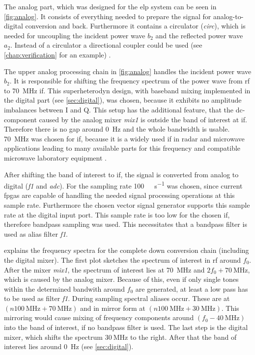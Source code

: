 \documentclass[12pt,a4paper,parskip=full,abstract=true,BCOR=10mm,twoside,open=right]{scrreprt}
\begin{document}
The analog part, which was designed for the \gls{elp} system can be seen in
\cref{fig:analog}. It consists of everything needed to prepare the signal
for analog-to-digital conversion and back. Furthermore it contains a
circulator (\textit{circ}), which is needed for uncoupling the
incident power wave $b_2$ and the reflected power wave $a_2$. Instead of a
circulator a directional coupler could be used (see
\cref{chap:verification} for an example) \cite{ghannouchi_load-pull_2013}.

The upper analog processing chain in \cref{fig:analog} handles the
incident power wave $b_2$. It is responsible for shifting the frequency spectrum
of the power wave from \gls{rf} to \SI{70}{\mega\hertz} \gls{if}. This
superheterodyn design, with baseband mixing implemented in the digital
part (see \cref{sec:digital}), was chosen, because it exhibits no amplitude
imbalances between I and Q. This setup has the additional feature, that
the \gls{dc}-component caused by the analog mixer \textit{mix1} is outside the
band of interest at \gls{if}. Therefore there is no gap around \SI{0}{\hertz}
and the whole bandwidth is usable. \SI{70}{\mega\hertz} was chosen for \gls{if},
because it is a widely used \gls{if} in radar and microwave applications
\cite{tozer_broadcast_2004,ahamed_design_1997,whitaker_rf_2002,penttinen_telecommunications_2015}
leading to many available parts for this frequency and compatible microwave
laboratory equipment \cite{agilent_h70}.

After shifting the band of interest to \gls{if}, the signal is converted from
analog to digital (\textit{f1} and \textit{adc}). For the sampling rate
\SI{100}{\mega\samples\per\second} was chosen, since current \glspl{fpga} are
capable of handling the needed signal processing operations at this sample
rate. Furthermore the chosen vector signal generator supports this sample rate
at the digital input port. This sample rate is too low for the chosen
\gls{if}, therefore bandpass sampling was used. This necessitates that a bandpass
filter is used as alias filter \textit{f1}.

 explains the frequency spectra for the complete down
conversion chain (including the digital mixer). The first plot sketches the
spectrum of interest in \gls{rf} around $f_0$. After the mixer \textit{mix1}, the
spectrum of interest lies at \SI{70}{\mega\hertz} and $2f_0 + \SI{70}{\mega\hertz}$,
which is caused by the analog mixer. Because of this, even if only single tones
within the determined bandwith around $f_0$ are generated, at least a low pass
has to be used as filter \textit{f1}. During sampling spectral aliases occur. These
are at $(n \SI{100}{\mega\hertz} + \SI{70}{\mega\hertz})$ and in mirror form at
$(n \SI{100}{\mega\hertz} + \SI{30}{\mega\hertz})$. This mirroring would cause mixing
of frequency components around $(f_0 - \SI{40}{\mega\hertz})$ into the band of interest,
if no bandpass filter is used. The last step is the digital mixer, which shifts
the spectrum $\SI{30}{\mega\hertz}$ to the right. After that the band of interest lies around
\SI{0}{\hertz} (see \cref{sec:digital}).
\end{document}
